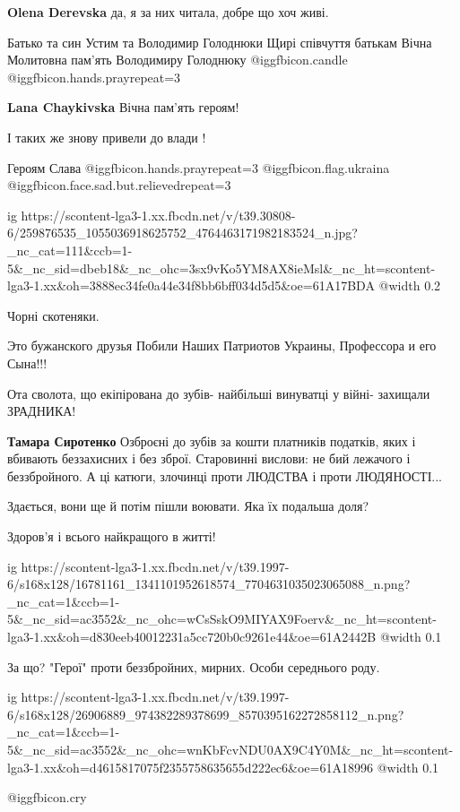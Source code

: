 \textbf{Olena Derevska} да, я за них читала, добре що хоч живі.


Батько та син Устим та Володимир Голоднюки
Щирі співчуття батькам Вічна Молитовна пам’ять Володимиру Голоднюку
 @igg{fbicon.candle}  @igg{fbicon.hands.pray}{repeat=3} 

\textbf{Lana Chaykivska} Вічна пам'ять героям!

І таких же знову привели до влади !

Героям Слава  @igg{fbicon.hands.pray}{repeat=3} @igg{fbicon.flag.ukraina} @igg{fbicon.face.sad.but.relieved}{repeat=3} 

\ifcmt
  ig https://scontent-lga3-1.xx.fbcdn.net/v/t39.30808-6/259876535_1055036918625752_4764463171982183524_n.jpg?_nc_cat=111&ccb=1-5&_nc_sid=dbeb18&_nc_ohc=3sx9vKo5YM8AX8ieMsl&_nc_ht=scontent-lga3-1.xx&oh=3888ec34fe0a44e34f8bb6bff034d5d5&oe=61A17BDA
  @width 0.2
\fi

Чорні скотеняки.

Это бужанского друзья
Побили Наших Патриотов Украины, Профессора и его Сына!!!

Ота сволота, що екіпірована до зубів- найбільші винуватці у війні- захищали ЗРАДНИКА!

\textbf{Тамара Сиротенко}
Озброєні до зубів за кошти платників податків, яких і вбивають
беззахисних і без зброї.
Старовинні вислови: не бий лежачого і беззбройного.
А ці катюги, злочинці проти ЛЮДСТВА і проти ЛЮДЯНОСТІ...

Здається, вони ще й потім пішли воювати. Яка їх подальша доля?

Здоров'я і всього найкращого в житті!

\ifcmt
  ig https://scontent-lga3-1.xx.fbcdn.net/v/t39.1997-6/s168x128/16781161_1341101952618574_7704631035023065088_n.png?_nc_cat=1&ccb=1-5&_nc_sid=ac3552&_nc_ohc=wCsSskO9MIYAX9Foerv&_nc_ht=scontent-lga3-1.xx&oh=d830eeb40012231a5cc720b0c9261e44&oe=61A2442B
  @width 0.1
\fi


За що? "Герої" проти беззбройних, мирних. Особи середнього роду.


\ifcmt
  ig https://scontent-lga3-1.xx.fbcdn.net/v/t39.1997-6/s168x128/26906889_974382289378699_8570395162272858112_n.png?_nc_cat=1&ccb=1-5&_nc_sid=ac3552&_nc_ohc=wnKbFcvNDU0AX9C4Y0M&_nc_ht=scontent-lga3-1.xx&oh=d4615817075f2355758635655d222ec6&oe=61A18996
  @width 0.1
\fi

 @igg{fbicon.cry} 
